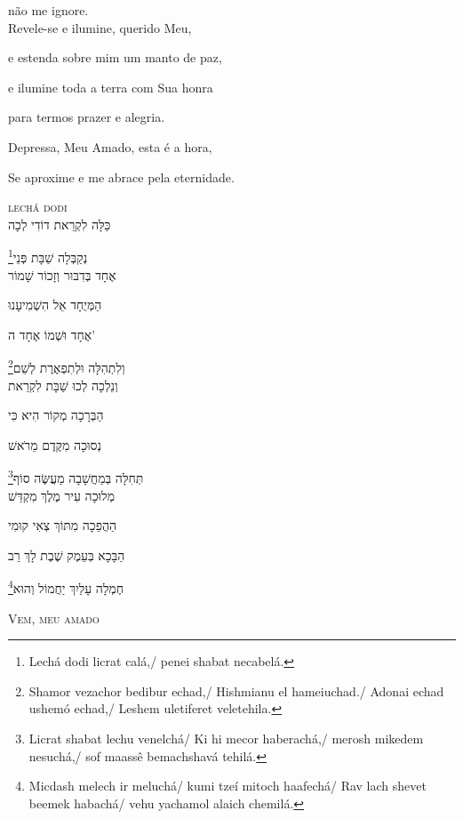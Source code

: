 não me ignore.\\[10pt]

Revele-se e ilumine, querido Meu,

e estenda sobre mim um manto de paz,

e ilumine toda a terra com Sua honra 

para termos prazer e alegria. 

Depressa, {Meu Amado}, esta é a hora,

Se aproxime e me abrace pela eternidade.

\movetoevenpage
\raggedleft
{}

\vspace*{1cm}

\textsc{lechá dodi}\\[15pt]

כַּלָּה לִקְרַאת דוֹדִי לְכָה

\footnote{Lechá dodi licrat calá,/ penei shabat necabelá.}נְקַבְּלָה שַׁבָּת פְּנֵי\\[10pt]

אֶחָד בְּדִבּוּר וְזָכוֹר שָׁמוֹר

הַמְּיֻחָד אֵל הִשְׁמִיעָנוּ

אֶחָד וּשְׁמוֹ אֶחָד ה' 

\footnote{Shamor vezachor bedibur echad,/ Hishmianu el hameiuchad./ Adonai echad ushemó echad,/ Leshem uletiferet veletehila.}וְלִתְהִלָּה וּלְתִפְאֶרֶת לְשֵׁם\\[10pt]

וְנֵלְכָה לְכוּ שַׁבָּת לִקְרַאת

הַבְּרָכָה מְקוֹר הִיא כִּי

נְסוּכָה מִקֶּדֶם מֵרֹאשׁ 

\footnote{Licrat shabat lechu venelchá/ Ki hi mecor haberachá,/ merosh mikedem nesuchá,/ sof maassê bemachshavá tehilá.}תְּחִלָּה בְּמַחֲשָׁבָה מַעֲשֶּׂה סוֹף\\[10pt]

מְלוּכָה עִיר מֶלֶךְ  מִקְדַּשׁ

הַהֲפֵכָה מִתּוֹךְ צְאִי קוּמִי 

הַבָּכָא בְּעֵמֶק שֶׁבֶת  לָךְ רַב

\footnote{Micdash melech ir meluchá/ kumi tzeí mitoch haafechá/ 
   Rav lach shevet beemek habachá/ vehu yachamol alaich chemilá.}חֶמְלָה עָלַיִךְ יַחֲמוֹל  וְהוּא\\[10pt]

\movetooddpage
\raggedright

\vspace*{1cm}
\textsc{Vem, meu amado}\\[15pt]


